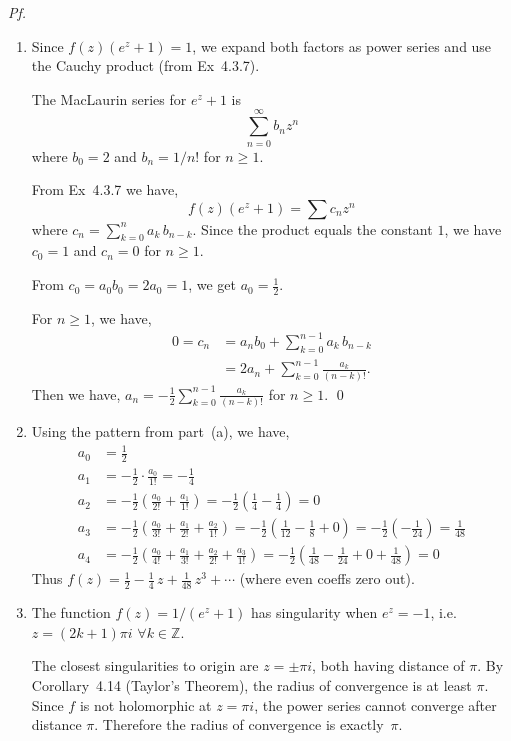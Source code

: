 \documentclass[a4paper]{article}
\begin{document}
\textit{Pf.} \begin{enumerate}
\item[\textbf{(a)}]
Since $f(z)(e^z+1)=1$, we expand both factors as power series and use the Cauchy product (from Ex~4.3.7).

The MacLaurin series for $e^z+1$ is 
\[
\sum_{n=0}^{\infty}b_n z^n
\]
where $b_0=2$ and $b_n=1/n!$ for $n\ge 1$.

From Ex~4.3.7 we have,
\[
f(z)(e^z+1)=\sum c_n z^n
\]
where $c_n=\sum_{k=0}^{n}a_k\,b_{n-k}$.
Since the product equals the constant $1$, we have $c_0=1$ and $c_n=0$ for $n\ge 1$.

From $c_0=a_0 b_0=2a_0=1$, we get $a_0=\tfrac{1}{2}$.

For $n\ge 1$, we have,
\begin{align*}
  0 = c_n &= a_n b_0 + \sum_{k=0}^{n-1}a_k\,b_{n-k}\\
  &= 2a_n + \sum_{k=0}^{n-1}\frac{a_k}{(n-k)!}.
\end{align*}
Then we have,
$\displaystyle a_n = -\frac{1}{2}\sum_{k=0}^{n-1}\frac{a_k}{(n-k)!}$ for $n \ge 1$. \qed

\medskip
\item[\textbf{(b)}]
Using the pattern from part~(a), we have,
\begin{align*}
  a_0 &= \tfrac{1}{2}\\
  a_1 &= -\tfrac{1}{2}\cdot\frac{a_0}{1!}
       = -\tfrac{1}{4}\\
  a_2 &= -\tfrac{1}{2}\!\left(\frac{a_0}{2!}+\frac{a_1}{1!}\right)
       = -\tfrac{1}{2}\!\left(\tfrac{1}{4}-\tfrac{1}{4}\right) = 0\\
  a_3 &= -\tfrac{1}{2}\!\left(\frac{a_0}{3!}+\frac{a_1}{2!}+\frac{a_2}{1!}\right)
       = -\tfrac{1}{2}\!\left(\tfrac{1}{12}-\tfrac{1}{8}+0\right)
       = -\tfrac{1}{2}\!\left(-\tfrac{1}{24}\right) = \tfrac{1}{48}\\
  a_4 &= -\tfrac{1}{2}\!\left(\frac{a_0}{4!}+\frac{a_1}{3!}+\frac{a_2}{2!}+\frac{a_3}{1!}\right)
       = -\tfrac{1}{2}\!\left(\tfrac{1}{48}-\tfrac{1}{24}+0+\tfrac{1}{48}\right) = 0
\end{align*}
Thus
$\displaystyle f(z) = \frac{1}{2}-\frac{1}{4}\,z+\frac{1}{48}\,z^3+\cdots$ (where even coeffs zero out).

\medskip
\item[\textbf{(c)}]
The function $f(z)=1/(e^z+1)$ has singularity when $e^z=-1$, i.e. $z=(2k+1)\pi i$ $\forall k\in\mathbb{Z}$.

The closest singularities to origin are $z=\pm\pi i$, both having distance of $\pi$.
By Corollary~4.14 (Taylor's Theorem), the radius of convergence is at least $\pi$.
Since $f$ is not holomorphic at $z=\pi i$, the power series cannot converge after distance $\pi$.
Therefore the radius of convergence is exactly~$\pi$.
\end{enumerate}
\newpage
\end{document}
